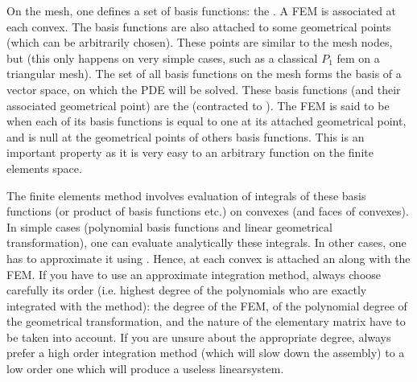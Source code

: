 \documentclass[a4paper,11pt,english]{sphinxmanual}
\begin{document}
On the mesh, one defines a set of basis functions: the . A FEM is
associated at each convex. The basis functions are also attached to some
geometrical points (which can be arbitrarily chosen). These points are similar to
the mesh nodes, but  (this only happens on very
simple cases, such as a classical \(P_1\) fem on a triangular mesh). The set
of all basis functions on the mesh forms the basis of a vector space, on which the
PDE will be solved. These basis functions (and their associated geometrical point)
are the  (contracted to ). The FEM is
said to be  when each of its basis functions is equal to one
at its attached geometrical point, and is null at the geometrical points of others
basis functions. This is an important property as it is very easy to
 an arbitrary function on the finite elements space.

The finite elements method involves evaluation of integrals of these basis
functions (or product of basis functions etc.) on convexes (and faces of
convexes). In simple cases (polynomial basis functions and linear geometrical
transformation), one can evaluate analytically these integrals. In other cases,
one has to approximate it using . Hence, at each
convex is attached an  along with the FEM. If you have
to use an approximate integration method, always choose carefully its order (i.e.
highest degree of the polynomials who are exactly integrated with the method): the
degree of the FEM, of the polynomial degree of the geometrical transformation, and
the nature of the elementary matrix have to be taken into account. If you are
unsure about the appropriate degree, always prefer a high order integration method
(which will slow down the assembly) to a low order one which will produce a
useless linear\sphinxhyphen{}system.
\end{document}
